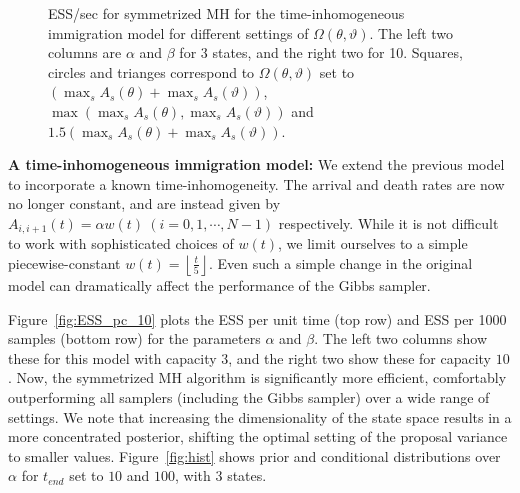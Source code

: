 \begin{figure}[H]
\begin{minipage}[hp]{0.24\linewidth}
	\end{minipage}
    \caption{ESS/sec for symmetrized MH for the time-inhomogeneous immigration model for different settings of $\Omega(\theta,\vartheta)$. The left two columns are $\alpha$ and $\beta$ for 3 states, and the right two for 10. 
    Squares, circles and trianges correspond to $\Omega(\theta,\vartheta)$ set to $(\max_s A_s(\theta) + \max_s A_s(\vartheta))$, $\max(\max_s A_s(\theta), \max_s A_s(\vartheta))$ and  $1.5(\max_s A_s(\theta) + \max_s A_s(\vartheta))$.}
     \label{fig:mhESS_CQ}
  \end{figure}


\vspace{-.1in}
\noindent \textbf{A time-inhomogeneous immigration model:}
We extend the previous model to incorporate a known time-inhomogeneity. 
The arrival and death rates are now no longer constant, and are instead given by
$A_{i, i+1}(t) = \alpha w(t) \ (i =0,1,\cdots,N-1)$ respectively.
While it is not difficult to work with sophisticated choices of $w(t)$, we limit ourselves to a simple piecewise-constant $w(t) = \left\lfloor \frac{t}{5} \right\rfloor$. 
Even such a simple change in the original model can dramatically affect the performance of the Gibbs sampler. 

Figure~\ref{fig:ESS_pc_10} plots the ESS per unit time (top row) and ESS per 1000 samples (bottom row) for the parameters $\alpha$ and $\beta$. 
The left two columns show these for this model with capacity $3$, and the right two show these for capacity $10$.  
 Now, the symmetrized MH algorithm is significantly more efficient, comfortably outperforming all samplers (including the Gibbs sampler) over a wide range of settings. %
 We note that increasing the dimensionality of the state space results in a more concentrated posterior, shifting the optimal setting of the proposal variance to smaller values. Figure~\ref{fig:hist} shows prior and conditional distributions over $\alpha$ for $t_{end}$ set to $10$ and $100$, with 3 states.

 \vspace{-.1in}
